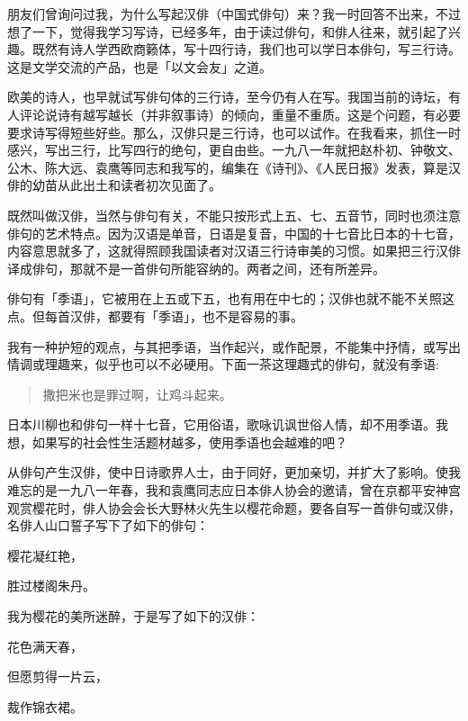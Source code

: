 {  朋友们曾询问过我，为什么写起汉俳（中国式俳句）来？我一时回答不出来，不过想了一下，觉得我学习写诗，已经多年，由于读过俳句，和俳人往来，就引起了兴趣。既然有诗人学西欧商籁体，写十四行诗，我们也可以学日本俳句，写三行诗。这是文学交流的产品，也是「以文会友」之道。

  欧美的诗人，也早就试写俳句体的三行诗，至今仍有人在写。我国当前的诗坛，有人评论说诗有越写越长（并非叙事诗）的倾向，重量不重质。这是个问题，有必要要求诗写得短些好些。那么，汉俳只是三行诗，也可以试作。在我看来，抓住一时感兴，写出三行，比写四行的绝句，更自由些。一九八一年就把赵朴初、钟敬文、公木、陈大远、袁鹰等同志和我写的，编集在《诗刊》、《人民日报》发表，算是汉俳的幼苗从此出土和读者初次见面了。

  既然叫做汉俳，当然与俳句有关，不能只按形式上五、七、五音节，同时也须注意俳句的艺术特点。因为汉语是单音，日语是复音，中国的十七音比日本的十七音，内容意思就多了，这就得照顾我国读者对汉语三行诗审美的习惯。如果把三行汉俳译成俳句，那就不是一首俳句所能容纳的。两者之间，还有所差异。

  俳句有「季语」，它被用在上五或下五，也有用在中七的；汉俳也就不能不关照这点。但每首汉俳，都要有「季语」，也不是容易的事。

  我有一种护短的观点，与其把季语，当作起兴，或作配景，不能集中抒情，或写出情调或理趣来，似乎也可以不必硬用。下面一茶这理趣式的俳句，就没有季语:

  \begin{quote}
      撒把米也是罪过啊，让鸡斗起来。
  \end{quote}

  日本川柳也和俳句一样十七音，它用俗语，歌咏讥讽世俗人情，却不用季语。我想，如果写的社会性生活题材越多，使用季语也会越难的吧？

  从俳句产生汉俳，使中日诗歌界人士，由于同好，更加亲切，并扩大了影响。使我难忘的是一九八一年春，我和袁鹰同志应日本俳人协会的邀请，曾在京都平安神宫观赏樱花时，俳人协会会长大野林火先生以樱花命题，要各自写一首俳句或汉俳，名俳人山口誓子写下了如下的俳句：

  \begin{center}
      樱花凝红艳，

      胜过楼阁朱丹。
  \end{center}

  我为樱花的美所迷醉，于是写了如下的汉俳：

  \begin{center}
      花色满天春，

      但愿剪得一片云，

      裁作锦衣裙。
  \end{center}

}
